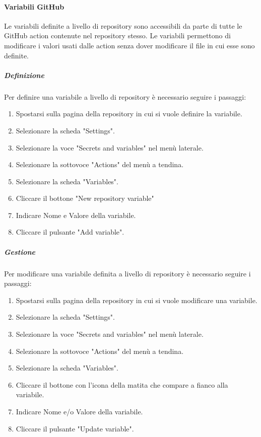\paragraph{Variabili GitHub}
Le variabili definite a livello di repository sono accessibili da parte di tutte le GitHub action contenute nel repository stesso.
Le variabili permettono di modificare i valori usati dalle action senza dover modificare il file in cui esse sono definite.

\subparagraph{Definizione}
Per definire una variabile a livello di repository è necessario seguire i passaggi:
\begin{enumerate}
    \item Spostarsi sulla pagina della repository in cui si vuole definire la variabile.
    \item Selezionare la scheda "Settings".
    \item Selezionare la voce "Secrets and variables" nel menù laterale.
    \item Selezionare la sottovoce "Actions" del menù a tendina.
    \item Selezionare la scheda "Variables".
    \item Cliccare il bottone "New repository variable" 
    \item Indicare Nome e Valore della variabile.
    \item Cliccare il pulsante "Add variable".
\end{enumerate}

\subparagraph{Gestione}
Per modificare una variabile definita a livello di repository è necessario seguire i passaggi:
\begin{enumerate}
    \item Spostarsi sulla pagina della repository in cui si vuole modificare una variabile.
    \item Selezionare la scheda "Settings".
    \item Selezionare la voce "Secrets and variables" nel menù laterale.
    \item Selezionare la sottovoce "Actions" del menù a tendina.
    \item Selezionare la scheda "Variables".
    \item Cliccare il bottone con l'icona della matita che compare a fianco alla variabile.
    \item Indicare Nome e/o Valore della variabile.
    \item Cliccare il pulsante "Update variable".
\end{enumerate}

